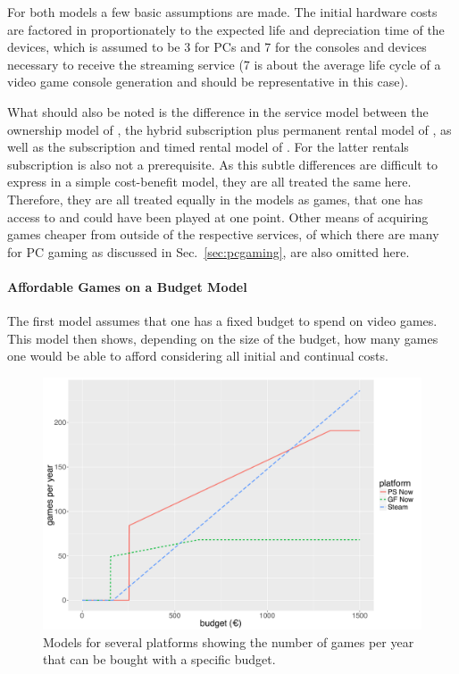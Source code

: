 For both models a few basic assumptions are made. The initial hardware costs are factored in proportionately to the expected life and depreciation time of the devices, which is assumed to be \SI{3}{\year} for PCs and \SI{7}{\year} for the consoles and devices necessary to receive the streaming service (\SI{7}{\year} is about the average life cycle of a video game console generation and should be representative in this case).

What should also be noted is the difference in the service model between the ownership model of \steam, the hybrid subscription plus permanent rental model of \gfnow, as well as the subscription and timed rental model of \psnow. For the latter rentals subscription is also not a prerequisite. As this subtle differences are difficult to express in a simple cost-benefit model, they are all treated the same here. Therefore, they are all treated equally in the models as games, that one has access to and could have been played at one point. Other means of acquiring games cheaper from outside of the respective services, of which there are many for PC gaming as discussed in Sec.~\ref{sec:pcgaming}, are also omitted here.

\paragraph{Affordable Games on a Budget Model}

The first model assumes that one has a fixed budget to spend on video games. This model then shows, depending on the size of the budget, how many games one would be able to afford considering all initial and continual costs.

\begin{figure}[!t]
	\centering
	\includegraphics[width=1.0\columnwidth]{images/gamesperyear-over-budget.pdf}
	\caption{Models for several platforms showing the number of games per year that can be bought with a specific budget.}
\label{fig:gamesperyear-over-budget}
\end{figure}

